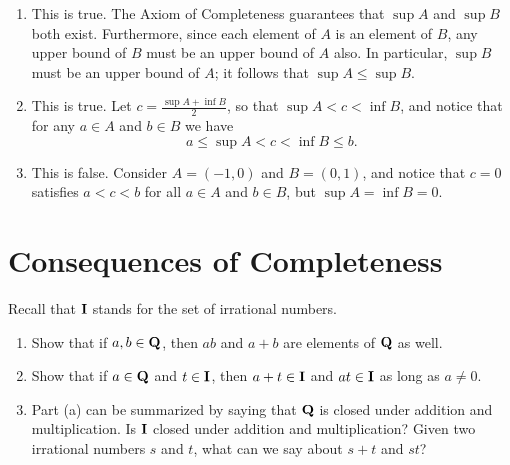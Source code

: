 \documentclass{lew98_solutions}
\begin{document}
\begin{solution}
    \begin{enumerate}
        \item This is true. The Axiom of Completeness guarantees that \( \sup A \) and \( \sup B \) both exist. Furthermore, since each element of \( A \) is an element of \( B \), any upper bound of \( B \) must be an upper bound of \( A \) also. In particular, \( \sup B \) must be an upper bound of \( A \); it follows that \( \sup A \leq \sup B \).

        \item This is true. Let \( c = \tfrac{\sup A + \inf B}{2} \), so that \( \sup A < c < \inf B\), and notice that for any \( a \in A \) and \( b \in B \) we have
        \[
            a \leq \sup A < c < \inf B \leq b.
        \]

        \item This is false. Consider \( A = (-1, 0) \) and \( B = (0, 1) \), and notice that \( c = 0 \) satisfies \( a < c < b \) for all \( a \in A \) and \( b \in B \), but \( \sup A = \inf B = 0 \).
    \end{enumerate}
\end{solution}

\section{Consequences of Completeness}
\label{sec:1.4}

\begin{exercise}
\label{ex:1.4.1}
    Recall that \( \mathbf{I} \) stands for the set of irrational numbers.
    \begin{enumerate}
        \item Show that if \( a, b \in \mathbf{Q} \), then \( ab \) and \( a + b \) are elements of \( \mathbf{Q} \) as well.

        \item Show that if \( a \in \mathbf{Q} \) and \( t \in \mathbf{I} \), then \( a + t \in \mathbf{I} \) and \( at \in \mathbf{I} \) as long as \( a \neq 0 \).

        \item Part (a) can be summarized by saying that \( \mathbf{Q} \) is closed under addition and multiplication. Is \( \mathbf{I} \) closed under addition and multiplication? Given two irrational numbers \( s \) and \( t \), what can we say about \( s + t \) and \( st \)?
    \end{enumerate}
\end{exercise}
\end{document}
